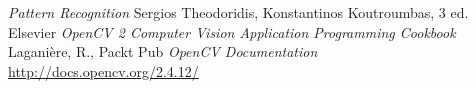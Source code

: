 \documentclass[conference, harvard, brazil, english]{sbatex}
\begin{document}
			
			
		\begin{thebibliography}{xx}
			 \textit{Pattern Recognition} Sergios Theodoridis, Konstantinos Koutroumbas, 3 ed. Elsevier
			\textit{OpenCV 2 Computer Vision Application Programming Cookbook} Laganière, R., Packt Pub
			\textit{OpenCV Documentation}
			\url{http://docs.opencv.org/2.4.12/}
		\end{thebibliography}
		
		
		
		
\end{document}
